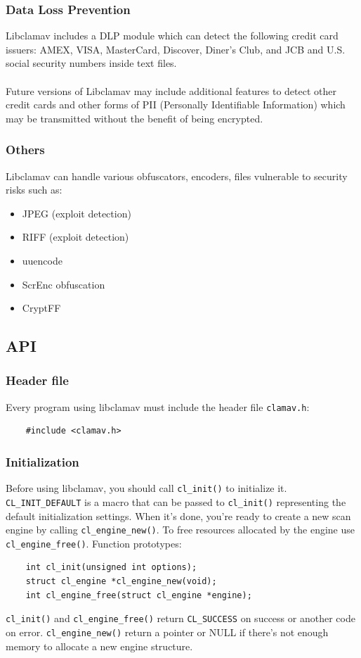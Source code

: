 \documentclass[a4paper,titlepage,12pt]{article}
\begin{document}
    \subsubsection{Data Loss Prevention}
    Libclamav includes a DLP module which can detect the following
    credit card issuers: AMEX, VISA, MasterCard, Discover, Diner's Club,
    and JCB and U.S. social security numbers inside text files.
    \\\\
    Future versions of Libclamav may include additional features to
    detect other credit cards and other forms of PII (Personally
    Identifiable Information) which may be transmitted without the
    benefit of being encrypted.

    \subsubsection{Others}
    Libclamav can handle various obfuscators, encoders, files vulnerable to
    security risks such as:
    \begin{itemize}
	\item JPEG (exploit detection)
	\item RIFF (exploit detection)
	\item uuencode
	\item ScrEnc obfuscation
	\item CryptFF
    \end{itemize}

    \subsection{API}

    \subsubsection{Header file}
    Every program using libclamav must include the header file \verb+clamav.h+:
    \begin{verbatim}
	#include <clamav.h>
    \end{verbatim}

    \subsubsection{Initialization}
    Before using libclamav, you should call \verb+cl_init()+ to initialize
    it. \verb+CL_INIT_DEFAULT+ is a macro that can be passed to \verb+cl_init()+
    representing the default initialization settings. When it's done, you're ready
    to create a new scan engine by calling \verb+cl_engine_new()+. To free resources
    allocated by the engine use \verb+cl_engine_free()+. Function prototypes:
    \begin{verbatim}
	int cl_init(unsigned int options);
	struct cl_engine *cl_engine_new(void);
	int cl_engine_free(struct cl_engine *engine);
    \end{verbatim}
    \verb+cl_init()+ and \verb+cl_engine_free()+ return \verb+CL_SUCCESS+
    on success or another code on error. \verb+cl_engine_new()+ return
    a pointer or NULL if there's not enough memory to allocate a new
    engine structure.
\end{document}
